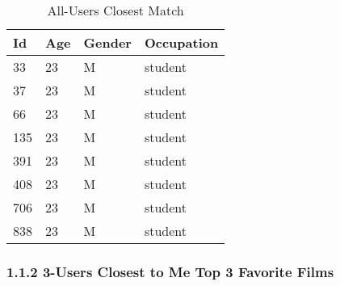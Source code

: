 \begin{table}[h!]
\centering
\begin{tabular}{| l | l | l | l |}
\hline
Id & Age & Gender & Occupation\\ \hline
			33 & 23 & M & student\\
			37 & 23 & M & student\\
			66 & 23 & M & student\\
			135 & 23 & M & student\\
			391 & 23 & M & student\\
			408 & 23 & M & student\\
			706 & 23 & M & student\\
			838 & 23 & M & student\\
\hline
\end{tabular}
	\caption{All-Users Closest Match} 
	\label{tab:close-match}
\end{table}

\subsubsection{1.1.2 3-Users Closest to Me Top 3 Favorite Films}

